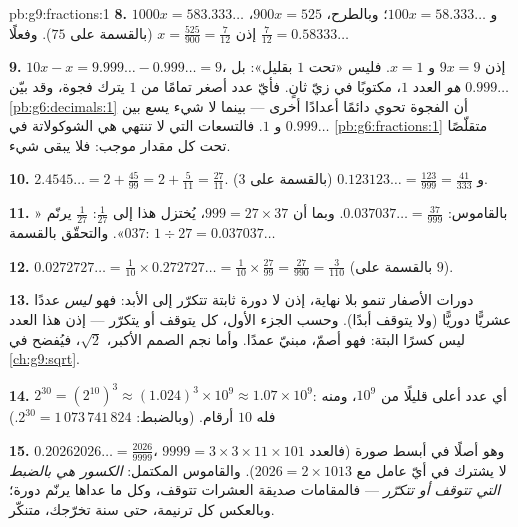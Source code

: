 \begin{solution}{pb:g9:fractions:1}
\textbf{8.} $1000x = 583.333\ldots$ و $100x = 58.333\ldots$؛
وبالطرح، $900x = 525$، إذن
$x = \frac{525}{900} = \frac{7}{12}$ (بالقسمة على $75$). وفعلًا
$\frac{7}{12} = 0.58333\ldots$

\textbf{9.} $10x - x = 9.999\ldots - 0.999\ldots = 9$، إذن
$9x = 9$ و $x = 1$. فليس «تحت $1$ بقليل»:
بل $0.999\ldots$ \emph{هو} العدد $1$، مكتوبًا في زيّ
ثانٍ. فأيّ عدد أصغر تمامًا من $1$ يترك فجوة، وقد
بيّن \cref{pb:g6:decimals:1} أن الفجوة تحوي دائمًا أعدادًا
أخرى --- بينما لا شيء يسع بين $0.999\ldots$ و $1$.
فالتسعات التي لا تنتهي هي  الشوكولاتة في
\cref{pb:g6:fractions:1} متقلّصًا تحت كل مقدار موجب:
فلا يبقى شيء.

\textbf{10.} $2.4545\ldots = 2 + \frac{45}{99} = 2 +
\frac{5}{11} = \frac{27}{11}$. و
$0.123123\ldots = \frac{123}{999} = \frac{41}{333}$ (بالقسمة على
$3$).

\textbf{11.} بالقاموس: $0.037037\ldots = \frac{37}{999}$.
وبما أن $999 = 27 \times 37$، يُختزل هذا إلى $\frac{1}{27}$:
 $\frac{1}{27}$ يرنّم «$037$». والتحقّق بالقسمة:
$1 \div 27 = 0.037037\ldots$

\textbf{12.} $0.0272727\ldots = \frac{1}{10} \times
0.272727\ldots = \frac{1}{10} \times \frac{27}{99}
= \frac{27}{990} = \frac{3}{110}$ (بالقسمة على $9$).

\textbf{13.} دورات الأصفار تنمو بلا نهاية، إذن لا دورة
ثابتة تتكرّر إلى الأبد: فهو \emph{ليس} عددًا عشريًّا دوريًّا
(ولا يتوقف أبدًا). وحسب الجزء الأول، كل  يتوقف أو
يتكرّر --- إذن هذا العدد ليس كسرًا البتة: فهو
أصمّ، مبنيّ عمدًا. وأما نجم الصمم الأكبر،
$\sqrt2$، فيُفضح في \cref{ch:g9:sqrt}.

\textbf{14.} $2^{30} = \left(2^{10}\right)^3 \approx
(1.024)^3 \times 10^9 \approx 1.07 \times 10^9$: أي عدد
أعلى قليلًا من $10^9$، ومنه فله $10$ أرقام. (وبالضبط:
$2^{30} = 1\,073\,741\,824$.)

\textbf{15.} $0.20262026\ldots = \frac{2026}{9999}$، وهو أصلًا
في أبسط صورة (فالعدد $9999 = 3 \times 3 \times 11 \times 101$ لا يشترك
في أيّ عامل مع $2026 = 2 \times 1013$). والقاموس
المكتمل: \emph{الكسور هي بالضبط  التي
تتوقف أو تتكرّر} --- فالمقامات صديقة العشرات تتوقف، وكل
ما عداها يرنّم دورة؛ وبالعكس كل ترنيمة، حتى سنة
تخرّجك،  متنكّر.
\end{solution}
